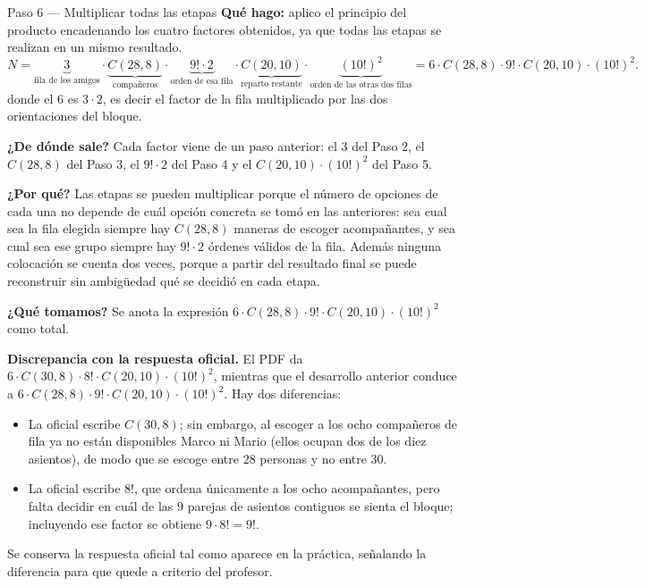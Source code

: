 \documentclass[11pt]{article}
\begin{document}
\begin{paso}{Paso 6 --- Multiplicar todas las etapas}
\textbf{Qué hago:} aplico el principio del producto encadenando los cuatro factores obtenidos, ya que todas las etapas se realizan en un mismo resultado.
\[
  N = \underbrace{3}_{\text{fila de los amigos}}\cdot
      \underbrace{C(28,8)}_{\text{compañeros}}\cdot
      \underbrace{9!\cdot 2}_{\text{orden de esa fila}}\cdot
      \underbrace{C(20,10)}_{\text{reparto restante}}\cdot
      \underbrace{(10!)^2}_{\text{orden de las otras dos filas}}
    = 6\cdot C(28,8)\cdot 9!\cdot C(20,10)\cdot (10!)^2 .
\]
donde el $6$ es $3\cdot 2$, es decir el factor de la fila multiplicado por las dos orientaciones del bloque.

\textbf{¿De dónde sale?} Cada factor viene de un paso anterior: el $3$ del Paso 2, el $C(28,8)$ del Paso 3, el $9!\cdot 2$ del Paso 4 y el $C(20,10)\cdot(10!)^2$ del Paso 5.

\textbf{¿Por qué?} Las etapas se pueden multiplicar porque el número de opciones de cada una no depende de cuál opción concreta se tomó en las anteriores: sea cual sea la fila elegida siempre hay $C(28,8)$ maneras de escoger acompañantes, y sea cual sea ese grupo siempre hay $9!\cdot 2$ órdenes válidos de la fila. Además ninguna colocación se cuenta dos veces, porque a partir del resultado final se puede reconstruir sin ambigüedad qué se decidió en cada etapa.

\textbf{¿Qué tomamos?} Se anota la expresión $6\cdot C(28,8)\cdot 9!\cdot C(20,10)\cdot (10!)^2$ como total.
\end{paso}

\begin{nota}
\textbf{Discrepancia con la respuesta oficial.} El PDF da $6\cdot C(30,8)\cdot 8!\cdot C(20,10)\cdot (10!)^2$, mientras que el desarrollo anterior conduce a $6\cdot C(28,8)\cdot 9!\cdot C(20,10)\cdot (10!)^2$. Hay dos diferencias:
\begin{itemize}[leftmargin=*]
  \item La oficial escribe $C(30,8)$; sin embargo, al escoger a los ocho compañeros de fila ya no están disponibles Marco ni Mario (ellos ocupan dos de los diez asientos), de modo que se escoge entre $28$ personas y no entre $30$.
  \item La oficial escribe $8!$, que ordena únicamente a los ocho acompañantes, pero falta decidir en cuál de las $9$ parejas de asientos contiguos se sienta el bloque; incluyendo ese factor se obtiene $9\cdot 8!=9!$.
\end{itemize}
Se conserva la respuesta oficial tal como aparece en la práctica, señalando la diferencia para que quede a criterio del profesor.
\end{nota}
\end{document}

